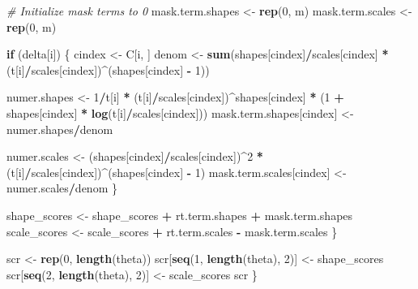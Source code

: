 \documentclass[
]{article}
\newenvironment{Shaded}{\begin{snugshade}}{\end{snugshade}}
\newcommand{\CommentTok}[1]{\textcolor[rgb]{0.56,0.35,0.01}{\textit{#1}}}
\newcommand{\ControlFlowTok}[1]{\textcolor[rgb]{0.13,0.29,0.53}{\textbf{#1}}}
\newcommand{\DecValTok}[1]{\textcolor[rgb]{0.00,0.00,0.81}{#1}}
\newcommand{\KeywordTok}[1]{\textcolor[rgb]{0.13,0.29,0.53}{\textbf{#1}}}
\newcommand{\NormalTok}[1]{#1}
\newcommand{\OperatorTok}[1]{\textcolor[rgb]{0.81,0.36,0.00}{\textbf{#1}}}
\newcommand{\StringTok}[1]{\textcolor[rgb]{0.31,0.60,0.02}{#1}}
\begin{document}
\begin{Shaded}
\begin{Highlighting}[]
        \CommentTok{\# Initialize mask terms to 0}
\NormalTok{        mask.term.shapes \textless{}{-}}\StringTok{ }\KeywordTok{rep}\NormalTok{(}\DecValTok{0}\NormalTok{, m)}
\NormalTok{        mask.term.scales \textless{}{-}}\StringTok{ }\KeywordTok{rep}\NormalTok{(}\DecValTok{0}\NormalTok{, m)}

        \ControlFlowTok{if}\NormalTok{ (delta[i]) \{}
\NormalTok{            cindex \textless{}{-}}\StringTok{ }\NormalTok{C[i, ]}
\NormalTok{            denom \textless{}{-}}\StringTok{ }\KeywordTok{sum}\NormalTok{(shapes[cindex]}\OperatorTok{/}\NormalTok{scales[cindex] }\OperatorTok{*}\StringTok{ }\NormalTok{(t[i]}\OperatorTok{/}\NormalTok{scales[cindex])}\OperatorTok{\^{}}\NormalTok{(shapes[cindex] }\OperatorTok{{-}}
\StringTok{                }\DecValTok{1}\NormalTok{))}

\NormalTok{            numer.shapes \textless{}{-}}\StringTok{ }\DecValTok{1}\OperatorTok{/}\NormalTok{t[i] }\OperatorTok{*}\StringTok{ }\NormalTok{(t[i]}\OperatorTok{/}\NormalTok{scales[cindex])}\OperatorTok{\^{}}\NormalTok{shapes[cindex] }\OperatorTok{*}
\StringTok{                }\NormalTok{(}\DecValTok{1} \OperatorTok{+}\StringTok{ }\NormalTok{shapes[cindex] }\OperatorTok{*}\StringTok{ }\KeywordTok{log}\NormalTok{(t[i]}\OperatorTok{/}\NormalTok{scales[cindex]))}
\NormalTok{            mask.term.shapes[cindex] \textless{}{-}}\StringTok{ }\NormalTok{numer.shapes}\OperatorTok{/}\NormalTok{denom}

\NormalTok{            numer.scales \textless{}{-}}\StringTok{ }\NormalTok{(shapes[cindex]}\OperatorTok{/}\NormalTok{scales[cindex])}\OperatorTok{\^{}}\DecValTok{2} \OperatorTok{*}\StringTok{ }\NormalTok{(t[i]}\OperatorTok{/}\NormalTok{scales[cindex])}\OperatorTok{\^{}}\NormalTok{(shapes[cindex] }\OperatorTok{{-}}
\StringTok{                }\DecValTok{1}\NormalTok{)}
\NormalTok{            mask.term.scales[cindex] \textless{}{-}}\StringTok{ }\NormalTok{numer.scales}\OperatorTok{/}\NormalTok{denom}
\NormalTok{        \}}

\NormalTok{        shape\_scores \textless{}{-}}\StringTok{ }\NormalTok{shape\_scores }\OperatorTok{+}\StringTok{ }\NormalTok{rt.term.shapes }\OperatorTok{+}\StringTok{ }\NormalTok{mask.term.shapes}
\NormalTok{        scale\_scores \textless{}{-}}\StringTok{ }\NormalTok{scale\_scores }\OperatorTok{+}\StringTok{ }\NormalTok{rt.term.scales }\OperatorTok{{-}}\StringTok{ }\NormalTok{mask.term.scales}
\NormalTok{    \}}

\NormalTok{    scr \textless{}{-}}\StringTok{ }\KeywordTok{rep}\NormalTok{(}\DecValTok{0}\NormalTok{, }\KeywordTok{length}\NormalTok{(theta))}
\NormalTok{    scr[}\KeywordTok{seq}\NormalTok{(}\DecValTok{1}\NormalTok{, }\KeywordTok{length}\NormalTok{(theta), }\DecValTok{2}\NormalTok{)] \textless{}{-}}\StringTok{ }\NormalTok{shape\_scores}
\NormalTok{    scr[}\KeywordTok{seq}\NormalTok{(}\DecValTok{2}\NormalTok{, }\KeywordTok{length}\NormalTok{(theta), }\DecValTok{2}\NormalTok{)] \textless{}{-}}\StringTok{ }\NormalTok{scale\_scores}
\NormalTok{    scr}
\NormalTok{\}}
\end{Highlighting}
\end{Shaded}
\end{document}
